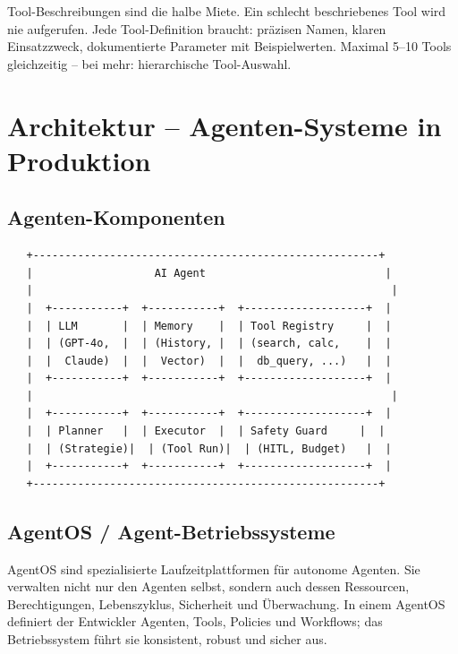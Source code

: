 \begin{praxishinweis}
Tool-Beschreibungen sind die halbe Miete. Ein schlecht beschriebenes Tool wird nie aufgerufen. Jede Tool-Definition braucht: präzisen Namen, klaren Einsatzzweck, dokumentierte Parameter mit Beispielwerten. Maximal 5--10 Tools gleichzeitig -- bei mehr: hierarchische Tool-Auswahl.
\end{praxishinweis}

\section{Architektur -- Agenten-Systeme in Produktion}

\subsection{Agenten-Komponenten}

\begin{verbatim}
   +------------------------------------------------------+
   |                   AI Agent                            |
   |                                                        |
   |  +-----------+  +-----------+  +-------------------+  |
   |  | LLM       |  | Memory    |  | Tool Registry     |  |
   |  | (GPT-4o,  |  | (History, |  | (search, calc,    |  |
   |  |  Claude)  |  |  Vector)  |  |  db_query, ...)   |  |
   |  +-----------+  +-----------+  +-------------------+  |
   |                                                        |
   |  +-----------+  +-----------+  +-------------------+  |
   |  | Planner   |  | Executor  |  | Safety Guard     |  |
   |  | (Strategie)|  | (Tool Run)|  | (HITL, Budget)   |  |
   |  +-----------+  +-----------+  +-------------------+  |
   +------------------------------------------------------+
\end{verbatim}

\subsection{AgentOS / Agent-Betriebssysteme}

AgentOS sind spezialisierte Laufzeitplattformen für autonome Agenten. Sie verwalten nicht nur den Agenten selbst, sondern auch dessen Ressourcen, Berechtigungen, Lebenszyklus, Sicherheit und Überwachung. In einem AgentOS definiert der Entwickler Agenten, Tools, Policies und Workflows; das Betriebssystem führt sie konsistent, robust und sicher aus.

